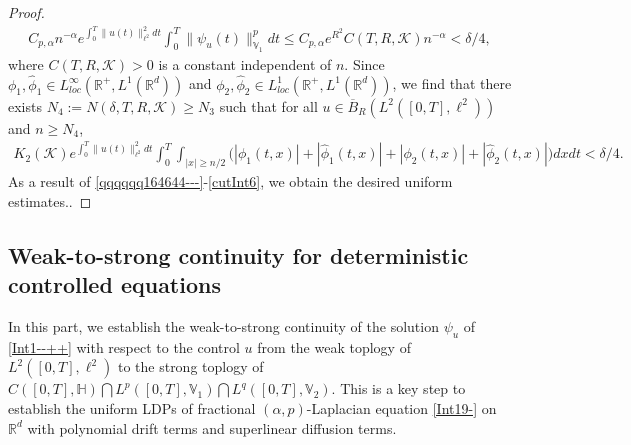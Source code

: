 \documentclass[11pt]{article}
\renewcommand{\leq}{\leqslant}
\renewcommand{\geq}{\geqslant}  %
\numberwithin{equation}{section}
\begin{document}
\begin{proof}
\begin{align}\label{cutInt5}
C_{p,\alpha}
n^{-\alpha}
e^{\int_0^T\|u(t)\|^2_{\ell^2}dt}\int_0^T
\|\psi_u(t)\|^{p
}_{\mathbb{V}_1}dt\leq C_{p,\alpha}e^{R^2}
C(T,R,\mathcal{K})
n^{-\alpha}
<\delta/4,
\end{align}
where $C(T,R,\mathcal{K})>0$ is a constant independent of $n$.
Since $\phi_1,\widehat{\phi}_1
 \in  L_{loc}^\infty(\mathbb{R}^+,
 L^1(\mathbb{R}^d))$ and $\phi_2,\widehat{\phi}_2\in L_{loc}^1(\mathbb{R}^+,
   L^1(\mathbb{R}^d))$, we find that  there exists $N_4:=N(\delta,T,R,\mathcal{K})\geq N_3$ such that for all $u\in \overline{B}_{R}(L^2([0,T],\ell^2))$ and $n\geq N_4$,
\begin{align}\label{cutInt6}
K_2(\mathcal{K})
e^{\int_0^T\|u(t)\|^2_{\ell^2}dt}
\int_0^T
\int_{|x|\geq n/2}
 \big(|\phi_1(t,x)|
 +|\widehat{\phi}_1(t,x)|+|\phi_2(t,x)|
 +|\widehat{\phi}_2(t,x)|
 \big)dxdt
<\delta/4.
\end{align}
As a result of \eqref{qqqqqq164644---}-\eqref{cutInt6},
we obtain the  desired uniform estimates..
\end{proof}


\subsection{Weak-to-strong continuity
for deterministic controlled equations
}
In this part, we establish the weak-to-strong
continuity of the solution
$\psi_u$ of \eqref{Int1--++} with respect
to the control
$u$ from the weak toplogy of
$L^2([0,T],\ell^2)$ to the strong toplogy of $C([0,T],\mathbb{H} )\bigcap L^p([0,T], \mathbb{V}_1  ) \bigcap L^q([0,T], \mathbb{V}_2)$. This is a key step to establish the uniform LDPs of fractional $(\alpha,p)$-Laplacian equation \eqref{Int19-} on $\mathbb{R}^d$ with polynomial drift terms and  superlinear diffusion terms.
\end{document}

